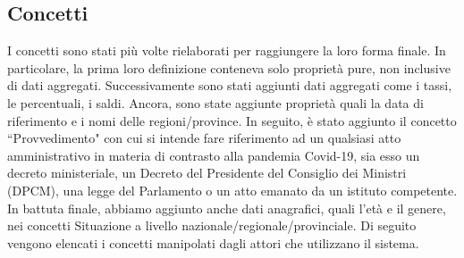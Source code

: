 \subsection{Concetti}
\label{ss:concetti}
I concetti sono stati più volte rielaborati per raggiungere la loro forma finale.
In particolare, la prima loro definizione conteneva solo proprietà pure, non inclusive di dati aggregati. Successivamente sono stati aggiunti dati aggregati come i tassi, le percentuali, i saldi.
Ancora, sono state aggiunte proprietà quali la data di riferimento e i nomi delle regioni/province.
In seguito, è stato aggiunto il concetto ``Provvedimento" con cui si intende fare riferimento ad un qualsiasi atto amministrativo in materia di contrasto alla pandemia Covid-19, sia esso un decreto ministeriale, un Decreto del Presidente del Consiglio dei Ministri (DPCM), una legge del Parlamento o un atto emanato da un istituto competente.
In battuta finale, abbiamo aggiunto anche dati anagrafici, quali l'età e il genere, nei concetti Situazione a livello nazionale/regionale/provinciale.
\noindent
Di seguito vengono elencati i concetti manipolati dagli attori che utilizzano il sistema.

